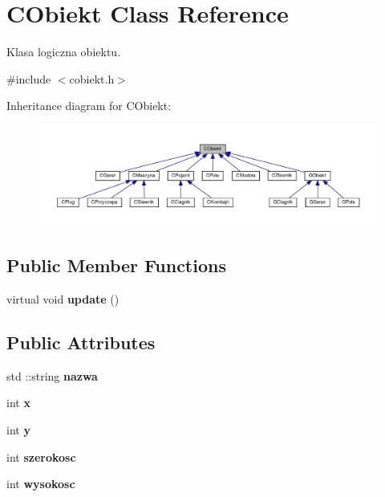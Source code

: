 \hypertarget{class_c_obiekt}{}\section{C\+Obiekt Class Reference}
\label{class_c_obiekt}


Klasa logiczna obiektu.  




{\ttfamily \#include $<$cobiekt.\+h$>$}



Inheritance diagram for C\+Obiekt\+:\nopagebreak
\begin{figure}[H]
\begin{center}
\leavevmode
\includegraphics[width=350pt]{class_c_obiekt__inherit__graph}
\end{center}
\end{figure}
\subsection*{Public Member Functions}
\begin{DoxyCompactItemize}
\item 
\mbox{\label{class_c_obiekt_adc05eb9790386eebbe24a31e434fd18f}} 
virtual void {\bfseries update} ()
\end{DoxyCompactItemize}
\subsection*{Public Attributes}
\begin{DoxyCompactItemize}
\item 
\mbox{\label{class_c_obiekt_ac9ed13ef043c761cfb0f203a5732d75a}} 
std \+::string {\bfseries nazwa}
\item 
\mbox{\label{class_c_obiekt_a76de83c57d6539d180f228f5304bb543}} 
int {\bfseries x}
\item 
\mbox{\label{class_c_obiekt_a468d7fd079cff08eaea0979c47f3b6a0}} 
int {\bfseries y}
\item 
\mbox{\label{class_c_obiekt_a3b4cdd9bed92efca2156ce1e0078e76b}} 
int {\bfseries szerokosc}
\item 
\mbox{\label{class_c_obiekt_a5c37ebf3252e0ec713e6e63eaba6fab8}} 
int {\bfseries wysokosc}
\end{DoxyCompactItemize}


